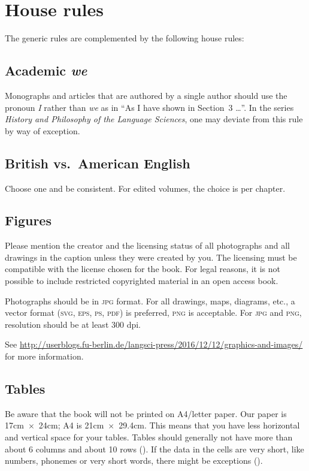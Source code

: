 \section{House rules}\label{sec:houserules}
The generic rules are complemented by the following house rules:

\subsection{Academic \emph{we}}

Monographs and articles that are authored by a single author should use the pronoun \emph{I} rather
than \emph{we} as in ``As I have shown in Section~3 {\dots}''. In the series \emph{History and Philosophy of the Language
Sciences}, one may deviate from this rule by way of exception.
 

\subsection{British vs.\ American English}
Choose one and be consistent. For edited volumes, the choice is per chapter.  


\subsection{Figures}  
Please mention the creator and the licensing status of all photographs and all drawings in the caption unless they were created by you. The licensing must be compatible with the license chosen for the book. For legal reasons, it is not possible to include restricted copyrighted material in an open access book. 

Photographs should be in \textsc{jpg} format. For all drawings, maps, diagrams, etc., a vector format (\textsc{svg}, \textsc{eps}, \textsc{ps}, \textsc{pdf}) is preferred, \textsc{png} is acceptable. For \textsc{jpg} and \textsc{png}, resolution should be at least 300 dpi. 

See \url{http://userblogs.fu-berlin.de/langsci-press/2016/12/12/graphics-and-images/} for more information.

\subsection{Tables}
Be aware that the book will not be printed on A4\slash letter paper. Our paper is 17cm~$\times$~24cm; A4 is 21cm~$\times$~29.4cm.  This means that you have less horizontal and vertical space for your tables. Tables should generally not have more than about 6 columns and about 10 rows (). If the data in the cells are very short, like numbers, phonemes or very short words, there might be exceptions ().


